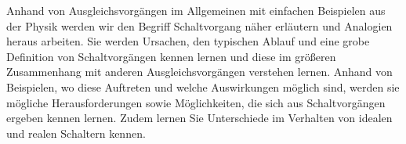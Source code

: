 \begin{frame}
{Anhand von Ausgleichsvorgängen im Allgemeinen mit einfachen Beispielen aus der Physik
werden wir den Begriff Schaltvorgang näher erläutern und Analogien heraus arbeiten.
Sie werden Ursachen, den typischen Ablauf und eine grobe Definition von Schaltvorgängen kennen lernen
und diese im größeren Zusammenhang mit anderen Ausgleichsvorgängen verstehen lernen. Anhand von Beispielen,
wo diese Auftreten und welche Auswirkungen möglich sind,
werden sie mögliche Herausforderungen sowie Möglichkeiten, die sich aus Schaltvorgängen ergeben kennen lernen.
Zudem lernen Sie Unterschiede im Verhalten von idealen und realen Schaltern kennen.
}%
\end{frame}


